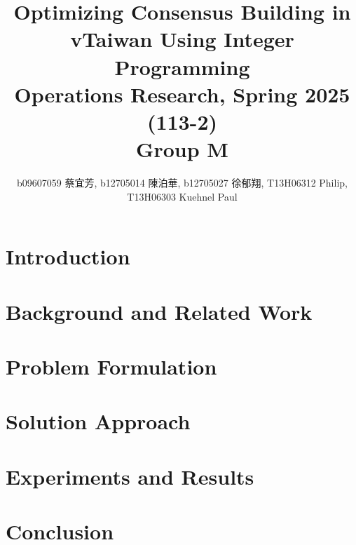 \documentclass[11pt]{article}
\title{Optimizing Consensus Building in vTaiwan Using Integer Programming \\
\large Operations Research, Spring 2025 (113-2) \\ Group M}
\author{b09607059 {\chinesefont 蔡宜芳}, b12705014 {\chinesefont 陳泊華},
    b12705027 {\chinesefont 徐郁翔}, T13H06312 Philip, T13H06303 Kuehnel Paul}
\affil{Department of Information Management, National Taiwan University}
\begin{document}
\maketitle


\section{Introduction}\label{sec:intro}


\section{Background and Related Work}\label{sec:background}


\section{Problem Formulation}\label{sec:problem_formulation}


%

\section{Solution Approach}\label{sec:solution}


\section{Experiments and Results}\label{sec:experiments}


%

\section{Conclusion}\label{sec:conclusion}


\printbibliography
\end{document}
